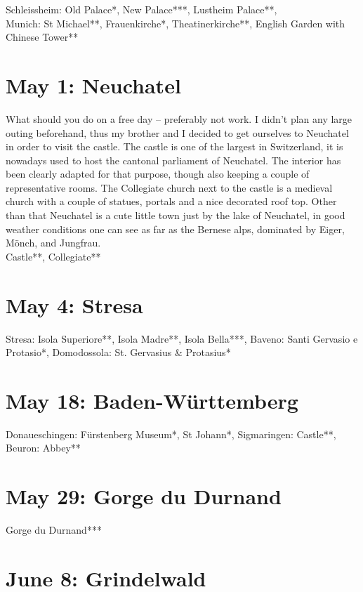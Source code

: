 Schleissheim: Old Palace*, New Palace***, Lustheim Palace**, \\
Munich: St Michael**, Frauenkirche*, Theatinerkirche**, English Garden with Chinese Tower**

\section{May 1: Neuchatel}
\label{Neuchatel2014}

What should you do on a free day -- preferably not work. I didn't plan any large outing beforehand, thus my brother and I decided to get ourselves to Neuchatel in order to visit the castle. The castle is one of the largest in Switzerland, it is nowadays used to host the cantonal parliament of Neuchatel. The interior has been clearly adapted for that purpose, though also keeping a couple of representative rooms. The Collegiate church next to the castle is a medieval church with a couple of statues, portals and a nice decorated roof top. Other than that Neuchatel is a cute little town just by the lake of Neuchatel, in good weather conditions one can see as far as the Bernese alps, dominated by Eiger, M\"onch, and Jungfrau.\\

Castle**, Collegiate**

\section{May 4: Stresa}
\label{Stresa2014}

Stresa: Isola Superiore**, Isola Madre**, Isola Bella***, Baveno: Santi Gervasio e Protasio*, Domodossola:  St. Gervasius \& Protasius*

\section{May 18: Baden-W\"urttemberg}
\label{Donaueschingen2014}

Donaueschingen: F\"urstenberg Museum*, St Johann*, Sigmaringen: Castle**, Beuron: Abbey**

\section{May 29: Gorge du Durnand}
\label{Durnand2014}

Gorge du Durnand***

\section{June 8: Grindelwald}
\label{Grindelwald2014}

